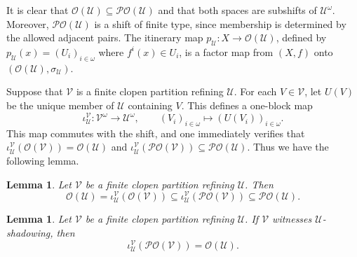 \documentclass[10pt,a4paper]{amsart}
\newtheorem{lemma}[theorem]{Lemma}
\numberwithin{equation}{section}
\begin{document}
It is clear that $\mathcal O(\mathcal U)\subseteq\mathcal{PO}(\mathcal U)$ and
that both spaces are subshifts of $\mathcal U^\omega$. Moreover,
$\mathcal{PO}(\mathcal U)$ is a shift of finite type, since membership is
determined by the allowed adjacent pairs. The itinerary map
$p_{\mathcal U}:X\to\mathcal O(\mathcal U)$, defined by
$p_{\mathcal U}(x)=(U_i)_{i\in\omega}$ where $f^i(x)\in U_i$, is a factor map
from $(X,f)$ onto $(\mathcal O(\mathcal U),\sigma_{\mathcal U})$.

Suppose that $\mathcal V$ is a finite clopen partition refining $\mathcal U$.
For each $V\in\mathcal V$, let $U(V)$ be the unique member of $\mathcal U$
containing $V$. This defines a one-block map
\[
    \iota_{\mathcal U}^{\mathcal V}:\mathcal V^\omega\to\mathcal U^\omega,
    \qquad
    (V_i)_{i\in\omega}\mapsto (U(V_i))_{i\in\omega}.
\]
This map commutes with the shift, and one immediately verifies that
$\iota_{\mathcal U}^{\mathcal V}(\mathcal O(\mathcal V))
=\mathcal O(\mathcal U)$ and
$\iota_{\mathcal U}^{\mathcal V}(\mathcal{PO}(\mathcal V))
\subseteq \mathcal{PO}(\mathcal U)$. Thus we have the following lemma.

\begin{lemma}\label{opo}\cite[Lemma 13]{GM}
Let $\mathcal V$ be a finite clopen partition refining $\mathcal U$. Then
\[
    \mathcal O(\mathcal U)
    =
    \iota_{\mathcal U}^{\mathcal V}(\mathcal O(\mathcal V))
    \subseteq
    \iota_{\mathcal U}^{\mathcal V}(\mathcal{PO}(\mathcal V))
    \subseteq
    \mathcal{PO}(\mathcal U).
\]
\end{lemma}

\begin{lemma}\label{sur}
Let $\mathcal V$ be a finite clopen partition refining $\mathcal U$. If
$\mathcal V$ witnesses $\mathcal U$-shadowing, then
\[
    \iota_{\mathcal U}^{\mathcal V}(\mathcal{PO}(\mathcal V))
    =
    \mathcal O(\mathcal U).
\]
\end{lemma}
\end{document}
